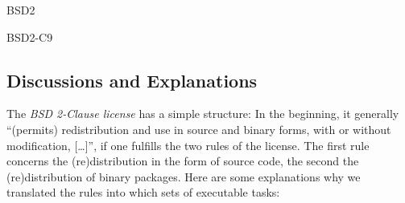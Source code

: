 \begin{license}{BSD2}
\begin{lsuc}{BSD2-C9}
  \lsucmeans{\useCaseNine}
  \lsuccovers{\coversNine}

  \begin{lsucrequires}
    \lsucmandatory{\insertLicenseIntoBinary}\passingFilesCorrectly
    \lsucoptional{\addLibraryLicenseToCopyrightMessage}
    \lsucoptional{\keepBinariesSeparate}
  \end{lsucrequires}

  \lsucprohibitsnothing
\end{lsuc}

\end{license}


\subsection{Discussions and Explanations}

The \textit{BSD 2-Clause license} has a simple structure: In the
beginning, it generally \enquote{(permits) redistribution and use in
source and binary forms, with or without modification, [\ldots]}, if one
fulfills the two rules of the license.\citeBSDsimple
The first rule concerns the (re)distribution in the form of source code, 
the second the (re)distribution of binary packages. Here are some
explanations why we translated the rules into which sets of executable tasks:

